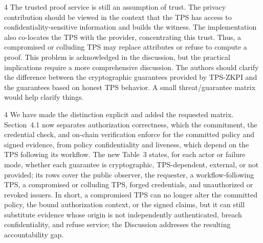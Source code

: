 \begin{reviewcomment}{4}
	The trusted proof service is still an assumption of trust.
	The privacy contribution should be viewed in the context that the TPS has access to confidentiality-sensitive information and builds the witness.
	The implementation also co-locates the TPS with the provider, concentrating this trust.
	Thus, a compromised or colluding TPS may replace attributes or refuse to compute a proof.
	This problem is acknowledged in the discussion, but the practical implications require a more comprehensive discussion.
	The authors should clarify the difference between the cryptographic guarantees provided by TPS-ZKPI and the guarantees based on honest TPS behavior.
	A small threat/guarantee matrix would help clarify things.
\end{reviewcomment}

\begin{reviewresponse}{4}
	We have made the distinction explicit and added the requested matrix.
	Section~4.1 now separates authorization correctness, which the commitment, the credential check, and on-chain verification enforce for the committed policy and signed evidence, from policy confidentiality and liveness, which depend on the TPS following its workflow.
	The new Table~3 states, for each actor or failure mode, whether each guarantee is cryptographic, TPS-dependent, external, or not provided; its rows cover the public observer, the requester, a workflow-following TPS, a compromised or colluding TPS, forged credentials, and unauthorized or revoked issuers.
	In short, a compromised TPS can no longer alter the committed policy, the bound authorization context, or the signed claims, but it can still substitute evidence whose origin is not independently authenticated, breach confidentiality, and refuse service; the Discussion addresses the resulting accountability gap.

\end{reviewresponse}
